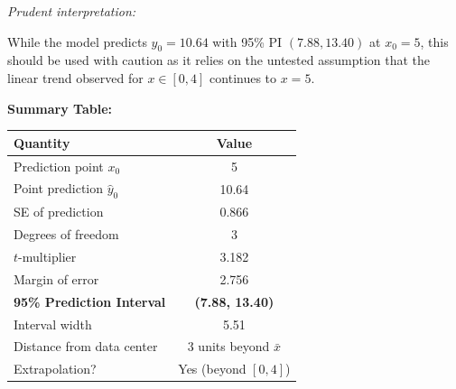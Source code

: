 \documentclass[12pt]{article}
\begin{document}
\begin{solution}
\textit{Prudent interpretation:}

While the model predicts $\hat{y}_0 = 10.64$ with 95\% PI $(7.88, 13.40)$ at $x_0 = 5$, this should be used with caution as it relies on the untested assumption that the linear trend observed for $x \in [0,4]$ continues to $x = 5$.

\textbf{Summary Table:}

\begin{center}
\begin{tabular}{|l|c|}
\hline
\textbf{Quantity} & \textbf{Value} \\
\hline
Prediction point $x_0$ & 5 \\
Point prediction $\hat{y}_0$ & 10.64 \\
SE of prediction & 0.866 \\
Degrees of freedom & 3 \\
$t$-multiplier & 3.182 \\
Margin of error & 2.756 \\
\textbf{95\% Prediction Interval} & \textbf{(7.88, 13.40)} \\
Interval width & 5.51 \\
Distance from data center & 3 units beyond $\bar{x}$ \\
Extrapolation? & Yes (beyond $[0,4]$) \\
\hline
\end{tabular}
\end{center}
\end{solution}
\end{document}
